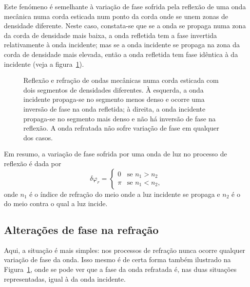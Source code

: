 Este fenómeno é semelhante à variação de fase sofrida pela reflexão de uma onda
mecânica numa corda esticada num ponto da corda onde se unem zonas de densidade
diferente. Neste caso, constata-se que se a onda se propaga numa zona da corda
de densidade mais baixa, a onda refletida tem a fase invertida relativamente à
onda incidente; mas se a onda incidente se propaga na zona da corda de densidade
mais elevada, então a onda refletida tem fase idêntica à da incidente (veja a
figura~\ref{fig:40-060}).
\begin{figure}[htb]
{\centering

\caption{Reflexão e refração de ondas mecânicas numa corda esticada com dois
segmentos de densidades diferentes. À esquerda, a onda incidente propaga-se no
segmento menos denso e ocorre uma inversão de fase na onda refletida; à direita,
a onda incidente propaga-se no segmento mais denso e não há inversão de fase na
reflexão. A onda refratada não sofre variação de fase em qualquer dos
casos.\label{fig:40-060}}

}
\end{figure}

Em resumo, a variação de fase sofrida por uma onda de luz no processo de
reflexão é dada por
\begin{equation*}
\delta\varphi_r = 
\begin{cases}
    0&\text{se } n_1>n_2\\
    \pi&\text{se } n_1<n_2,
\end{cases}
\end{equation*}
onde $n_1$ é o índice de refração do meio onde a luz incidente se propaga e
$n_2$ é o do meio contra o qual a luz incide.


\subsection*{Alterações de fase na refração}
Aqui, a situação é mais simples: nos processos de refração nunca ocorre qualquer
variação de fase da onda. Isso mesmo é de certa forma também ilustrado na
Figura~\ref{fig:40-060}, onde se pode ver que a fase da onda refratada é, nas
duas situações representadas, igual à da onda incidente.

